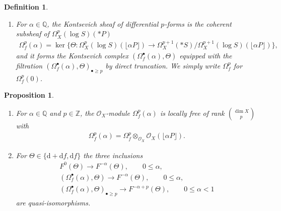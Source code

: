 \documentclass[11pt]{article}
\newcommand{\QQ}{\mathbb{Q}}
\newcommand{\ZZ}{\mathbb{Z}}
\newcommand{\sO}{\mathscr{O}}
\newcommand{\de}{\mathrm{d}}
\newcommand{\ddRH}{\Theta}
\newcommand{\flr}[1]{\lfloor #1 \rfloor}
\newtheorem{proposition}{Proposition}
\newtheorem*{definition*}{Definition}
\begin{document}
\begin{definition*}
\begin{enumerate}
\item[(iv)] For $\alpha\in\QQ$, the \textit{Kontsevich sheaf of differential $p$-forms} is the coherent subsheaf of $\Omega_X^p(\log S)(*P)$
\begin{gather*} \Omega_f^p(\alpha) = \ker\big\{ \ddRH\colon \Omega_X^p(\log S)(\flr{\alpha P}) \to \Omega_X^{p+1}(*S)/\Omega_X^{p+1}(\log S)(\flr{\alpha P}) \big\}, \end{gather*}
and it forms the \textit{Kontsevich complex} $(\Omega_f^\bullet(\alpha), \ddRH)$ equipped with the filtration $(\Omega_f^\bullet(\alpha), \ddRH)_{\bullet\geq p}$ by direct truncation. We simply write $\Omega_f^p$ for $\Omega_f^p(0)$.
\end{enumerate}
\end{definition*}

\begin{proposition}\label{Prop:Kont-Log}\quad
\begin{enumerate}\itemsep=0pt
\item For $\alpha\in\QQ$ and $p\in\ZZ$, the $\sO_X$-module $\Omega_f^p(\alpha)$ is locally free of rank $\binom{\dim X}{p}$ with
\begin{gather*} \Omega_f^p(\alpha) = \Omega_f^p \otimes_{\sO_X}\sO_X(\flr{\alpha P}). \end{gather*}
\item For $\ddRH\in\{\de +\de f, \de f\}$ the three inclusions
\begin{gather*}
F^0(\ddRH) \to F^{-\alpha}(\ddRH), \qquad 0\leq \alpha, \\
(\Omega_f^\bullet(\alpha),\ddRH) \to F^{-\alpha}(\ddRH), \qquad 0\leq \alpha, \\
(\Omega_f^\bullet(\alpha),\ddRH)_{\bullet\geq p} \to F^{-\alpha +p}(\ddRH), \qquad 0\leq \alpha <1
\end{gather*}
are quasi-isomorphisms.
\end{enumerate}
\end{proposition}
\end{document}
